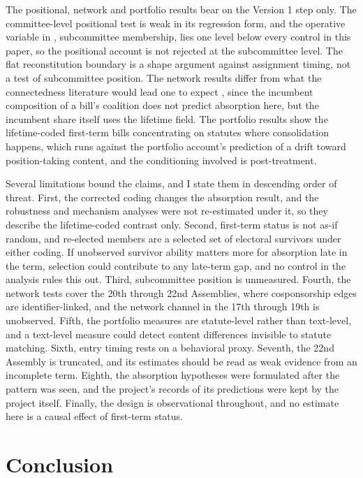 \documentclass[11pt]{article}
\begin{document}
The positional, network and portfolio results bear on the Version 1 step only. The committee-level positional test is weak in its regression form, and the operative variable in \citet{kim2023}, subcommittee membership, lies one level below every control in this paper, so the positional account is not rejected at the subcommittee level. The flat reconstitution boundary is a shape argument against assignment timing, not a test of subcommittee position. The network results differ from what the connectedness literature would lead one to expect \citep{battaglini2020, fowler2006}, since the incumbent composition of a bill's coalition does not predict absorption here, but the incumbent share itself uses the lifetime field. The portfolio results show the lifetime-coded first-term bills concentrating on statutes where consolidation happens, which runs against the portfolio account's prediction of a drift toward position-taking content, and the conditioning involved is post-treatment.

Several limitations bound the claims, and I state them in descending order of threat. First, the corrected coding changes the absorption result, and the robustness and mechanism analyses were not re-estimated under it, so they describe the lifetime-coded contrast only. Second, first-term status is not as-if random, and re-elected members are a selected set of electoral survivors under either coding. If unobserved survivor ability matters more for absorption late in the term, selection could contribute to any late-term gap, and no control in the analysis rules this out. Third, subcommittee position is unmeasured. Fourth, the network tests cover the 20th through 22nd Assemblies, where cosponsorship edges are identifier-linked, and the network channel in the 17th through 19th is unobserved. Fifth, the portfolio measures are statute-level rather than text-level, and a text-level measure could detect content differences invisible to statute matching. Sixth, entry timing rests on a behavioral proxy. Seventh, the 22nd Assembly is truncated, and its estimates should be read as weak evidence from an incomplete term. Eighth, the absorption hypotheses were formulated after the pattern was seen, and the project's records of its predictions were kept by the project itself. Finally, the design is observational throughout, and no estimate here is a causal effect of first-term status.

\section{Conclusion}
\end{document}
